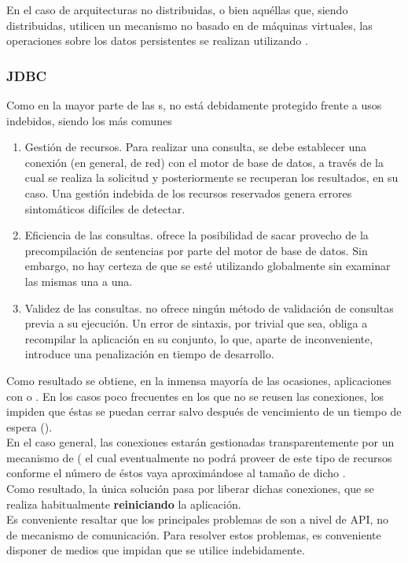 \documentclass[dvips]{article}
\begin{document}
En el caso de arquitecturas no distribuidas, o bien aqu\'ellas que,
siendo distribuidas, utilicen un mecanismo no basado en
 de m\'aquinas virtuales, las operaciones 
sobre los datos persistentes se realizan utilizando .\\

\subsubsection{JDBC}
Como en la mayor parte de las s,  no est\'a
debidamente protegido frente a usos indebidos, siendo los m\'as
comunes
\begin{enumerate}
  \item Gesti\'on de recursos. Para realizar una consulta, se debe
  establecer una conexi\'on (en general, de red) con el motor de base
  de datos, a trav\'es de la cual se realiza la solicitud y
  posteriormente se recuperan los resultados, en su caso. Una
  gesti\'on indebida de los recursos reservados genera errores
  sintom\'aticos dif\'i{}ciles de detectar.
  \item Eficiencia de las consultas.  ofrece la posibilidad
  de sacar provecho de la precompilaci\'on de sentencias 
  por parte del motor de base de datos. Sin embargo, no hay certeza de
  que se est\'e utilizando globalmente sin examinar las mismas una a
  una.
  \item Validez de las consultas.  no ofrece ning\'un
  m\'etodo de validaci\'on de consultas previa a su ejecuci\'on. Un
  error de sintaxis, por trivial que sea, obliga a recompilar la
  aplicaci\'on en su conjunto, lo que, aparte de inconveniente,
  introduce una penalizaci\'on en tiempo de desarrollo.
\end{enumerate}
Como resultado se obtiene, en la inmensa mayor\'i{}a de las ocasiones,
aplicaciones con  o  .
En los casos poco frecuentes en los que no se reusen las conexiones,
los  impiden que \'estas se puedan cerrar salvo despu\'es
de vencimiento de un tiempo de espera ().\\
En el caso general, las conexiones estar\'an gestionadas
transparentemente por un mecanismo de  ( el cual eventualmente no podr\'a proveer de este tipo de
recursos conforme el n\'umero de \'estos vaya aproxim\'andose al
tama\~no de dicho .\\
Como resultado, la \'unica soluci\'on pasa por liberar dichas
conexiones, que se realiza habitualmente \textbf{reiniciando} la
aplicaci\'on.\\
Es conveniente resaltar que los principales problemas de 
son a nivel de API, no de mecanismo de comunicaci\'on. Para resolver
estos problemas, es conveniente disponer de medios que impidan
que  se utilice indebidamente.
\end{document}
